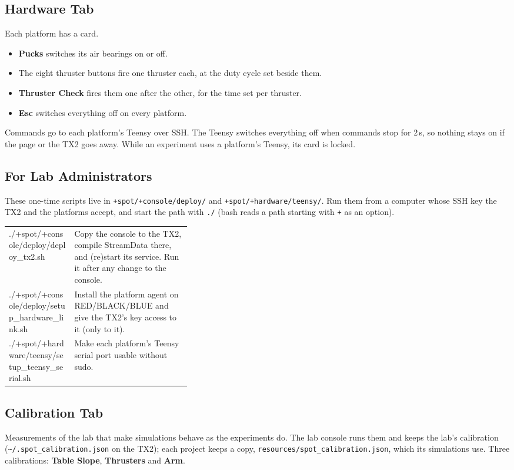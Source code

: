 \documentclass[11pt,a4paper]{article}
\newcommand{\ui}[1]{\textsf{\textbf{#1}}}
\newcommand{\pth}[1]{\texttt{#1}}
\begin{document}
\subsection{Hardware Tab}
Each platform has a card.
\begin{itemize}
  \item \ui{Pucks} switches its air bearings on or off.
  \item The eight thruster buttons fire one thruster each, at the duty cycle set beside them.
  \item \ui{Thruster Check} fires them one after the other, for the time set per thruster.
  \item \textbf{Esc} switches everything off on every platform.
\end{itemize}
Commands go to each platform's Teensy over SSH. The Teensy switches everything off when commands stop for 2\,s, so
nothing stays on if the page or the TX2 goes away. While an experiment uses a platform's Teensy, its card is locked.

\subsection{For Lab Administrators}
These one-time scripts live in \pth{+spot/+console/deploy/} and \pth{+spot/+hardware/teensy/}. Run them from a
computer whose SSH key the TX2 and the platforms accept, and start the path with \pth{./} (bash reads a path
starting with \texttt{+} as an option).
\begin{xltabular}{\linewidth}{@{}>{\ttfamily\raggedright\arraybackslash}p{0.36\linewidth} X@{}}
\toprule
./\allowbreak{}+spot/\allowbreak{}+console/\allowbreak{}deploy/\allowbreak{}deploy\_tx2.sh & Copy the console to the TX2, compile StreamData there, and (re)start its
                                        service. Run it after any change to the console. \\
./\allowbreak{}+spot/\allowbreak{}+console/\allowbreak{}deploy/\allowbreak{}setup\_hardware\_link.sh & Install the platform agent on RED/BLACK/BLUE and give the TX2's key
                                        access to it (only to it). \\
./\allowbreak{}+spot/\allowbreak{}+hardware/\allowbreak{}teensy/\allowbreak{}setup\_teensy\_serial.sh & Make each platform's Teensy serial port usable without sudo. \\
\bottomrule
\end{xltabular}

\subsection{Calibration Tab}\label{sec:calibration}
Measurements of the lab that make simulations behave as the experiments do. The lab console runs them and keeps the
lab's calibration (\pth{\textasciitilde/.spot\_calibration.json} on the TX2); each project keeps a copy,
\pth{resources/spot\_calibration.json}, which its simulations use. Three calibrations: \ui{Table Slope},
\ui{Thrusters} and \ui{Arm}.
\end{document}
